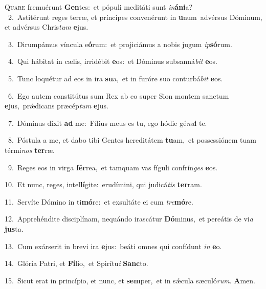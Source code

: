 \lettrine{\initial\textcolor{\initialcolor}{Q}}{uare} fremuérunt \textbf{Gen}\-tes:~\star et pópuli meditáti sunt \textit{in}\-\textbf{á}\textbf{ni}a?\\
{\numbfont\textcolor{\numbcolor}{~2.}}~Astitérunt reges terræ, et príncipes convenérunt in \textbf{u}\-num~\star advérsus Dóminum, et advérsus Chris\textit{tum} \textbf{e}\-jus.\par
{\numbfont\textcolor{\numbcolor}{~3.}}~Dirumpámus víncula e\-\textbf{ó}\-rum:~\star et projiciámus a nobis jugum \textit{ip}\-\textbf{só}rum.\par
{\numbfont\textcolor{\numbcolor}{~4.}}~Qui hábitat in cælis, irridébit \textbf{e}\-os:~\star et Dóminus subsanná\textit{bit} \textbf{e}\-os.\par
{\numbfont\textcolor{\numbcolor}{~5.}}~Tunc loquétur ad eos in ira \textbf{su}\-a,~\star et in furóre suo conturbá\textit{bit} \textbf{e}\-os.\par
{\numbfont\textcolor{\numbcolor}{~6.}}~Ego autem constitútus sum Rex ab eo super Sion montem sanctum \textbf{e}\-jus,~\star prǽdicans præcép\textit{tum} \textbf{e}\-jus.\par
{\numbfont\textcolor{\numbcolor}{~7.}}~Dóminus dixit \textbf{ad} me:~\star Fílius meus es tu, ego hódie gé\-\textit{nu}\-\textbf{i} te.\par
{\numbfont\textcolor{\numbcolor}{~8.}}~Póstula a me, et dabo tibi Gentes hereditátem \textbf{tu}\-am,~\star et possessiónem tuam térmi\textit{nos} \textbf{ter}\-ræ.\par
{\numbfont\textcolor{\numbcolor}{~9.}}~Reges eos in virga \textbf{fér}\-rea,~\star et tamquam vas fíguli confrín\textit{ges} \textbf{e}\-os.\par
{\numbfont\textcolor{\numbcolor}{10.}}~Et nunc, reges, intel\-\textbf{lí}\-gite:~\star erudímini, qui judicá\textit{tis} \textbf{ter}\-ram.\par
{\numbfont\textcolor{\numbcolor}{11.}}~Servíte Dómino in ti\-\textbf{mó}\-re:~\star et exsultáte ei cum \textit{tre}\-\textbf{mó}re.\par
{\numbfont\textcolor{\numbcolor}{12.}}~Apprehéndite disciplínam, nequándo irascátur \textbf{Dó}\-minus,~\star et pereátis de vi\textit{a} \textbf{jus}\-ta.\par
{\numbfont\textcolor{\numbcolor}{13.}}~Cum exárserit in brevi ira \textbf{e}\-jus:~\star beáti omnes qui confídunt \textit{in} \textbf{e}\-o.\par
{\numbfont\textcolor{\numbcolor}{14.}}~Glória Patri, et \textbf{Fí}\-lio,~\star et Spirítu\textit{i} \textbf{Sanc}\-to.\par
{\numbfont\textcolor{\numbcolor}{15.}}~Sicut erat in princípio, et nunc, et \textbf{sem}\-per,~\star et in sǽcula sæculó\-\textit{rum}\-. \textbf{A}\-men.\par
